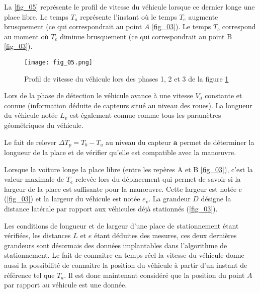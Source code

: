 La \autoref{fig_05} représente le profil de vitesse du véhicule lorsque ce dernier longe une place libre. Le temps $T_a$
représente l’instant où le temps $T_e$ augmente brusquement (ce qui correspondrait au point $A$ \autoref{fig_03}). Le temps
$T_b$
correspond au moment où $T_e$ diminue brusquement (ce qui correspondrait au point B \autoref{fig_03}).

\begin{figure}[H]
\centering
\texttt{[image: fig\_05.png]}
\caption{Profil de vitesse du véhicule lors des phases 1, 2 et 3 de la figure \ref{fig_05} \label{fig_05}}
\end{figure}

Lors de la phase de détection le véhicule avance à une vitesse $V_d$ constante et connue (information déduite de
capteurs situé au niveau des roues). La longueur du véhicule notée $L_v$
est également connue comme tous les
paramètres géométriques du véhicule.

Le fait de relever $\Delta T_p = T_b - T_a$ au niveau du capteur \textbf{a} permet de déterminer la longueur de la place et de vérifier qu’elle est compatible avec la manœuvre.


Lorsque la voiture longe la place libre (entre les repères A et B \autoref{fig_03}), c’est la valeur maximale de $T_e$ relevée
lors du déplacement qui permet de savoir si la largeur de la place est suffisante pour la manœuvre. Cette largeur
est notée $e$ (\autoref{fig_03}) et la largeur du véhicule est notée $e_v$. La grandeur $D$ désigne la distance latérale par rapport aux véhicules déjà stationnés (\autoref{fig_03}).


Les conditions de longueur et de largeur d’une place de stationnement étant vérifiées, les distances $L$ et $e$ étant déduites des mesures, ces deux dernières grandeurs sont désormais des données implantables dans l’algorithme de stationnement. Le fait de connaitre en temps réel la vitesse du véhicule donne aussi la possibilité de connaitre la position du véhicule à partir d’un instant de référence tel que $T_a$. Il est donc maintenant considéré que la
position du point $A$ par rapport au véhicule est une donnée.

